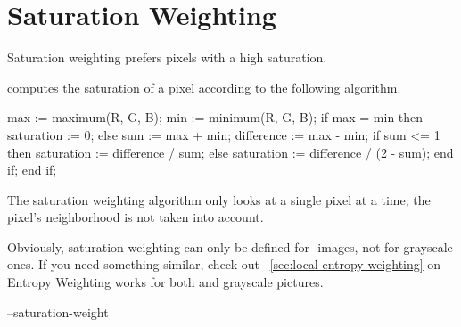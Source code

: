 

\section[Saturation Weighting]{\label{sec:saturation-weighting}%
  Saturation Weighting}

Saturation weighting prefers pixels with a high saturation.

\App{} computes the saturation of a pixel according to the following algorithm.

\begin{adalisting}
max := maximum(R, G, B);
min := minimum(R, G, B);
if max = min then
    saturation := 0;
else
    sum := max + min;
    difference := max - min;
    if sum <= 1 then
        saturation := difference / sum;
    else
        saturation := difference / (2 - sum);
    end if;
end if;
\end{adalisting}

The saturation weighting algorithm only looks at a single pixel at a time; the pixel's
neighborhood is not taken into account.

Obviously, saturation weighting can only be defined for
-images, not for grayscale ones.  If you need something similar, check out
\sectionName~\ref{sec:local-entropy-weighting} on Entropy Weighting works for both 
and grayscale pictures.

\begin{optionsummary}
\item[--saturation-weight] \sectionName~
\end{optionsummary}


